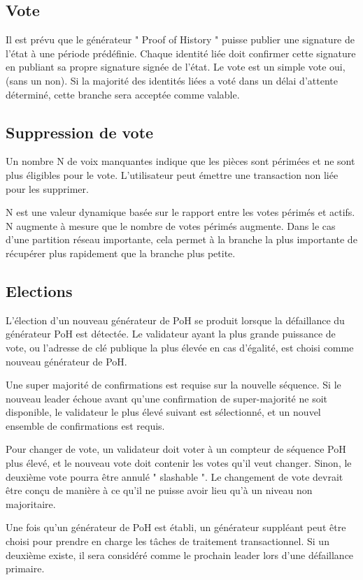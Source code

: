 \documentclass[12pt]{article}
\begin{document}
\subsection{Vote}
Il est prévu que le générateur " Proof of History " puisse publier une signature de l'état à une période prédéfinie. Chaque identité liée doit confirmer cette signature en publiant sa propre signature signée de l'état. Le vote est un simple vote oui, (sans un non).  Si la majorité des identités liées a voté dans un délai d’attente déterminé, cette branche sera acceptée comme valable.

\subsection{Suppression de vote}

Un nombre N de voix manquantes indique que les pièces sont périmées et ne sont plus éligibles pour le vote. L'utilisateur peut émettre une transaction non liée pour les supprimer.

N est une valeur dynamique basée sur le rapport entre les votes périmés et actifs. N augmente à mesure que le nombre de votes périmés augmente. Dans le cas d'une partition réseau importante, cela permet à la branche la plus importante de récupérer plus rapidement que la branche plus petite.

\subsection{Elections}\label{subsec:elections}
L'élection d'un nouveau générateur de PoH se produit lorsque la défaillance du générateur PoH est détectée. Le validateur ayant la plus grande puissance de vote, ou l'adresse de clé publique la plus élevée en cas d'égalité, est choisi comme nouveau générateur de PoH.

Une super majorité de confirmations est requise sur la nouvelle séquence. Si le nouveau leader échoue avant qu'une confirmation de super-majorité ne soit disponible, le validateur le plus élevé suivant est sélectionné, et un nouvel ensemble de confirmations est requis.

Pour changer de vote, un validateur doit voter à un compteur de séquence PoH plus élevé, et le nouveau vote doit contenir les votes qu'il veut changer. Sinon, le deuxième vote pourra être annulé " slashable ". Le changement de vote devrait être conçu de manière à ce qu'il ne puisse avoir lieu qu'à un niveau non majoritaire.

Une fois qu'un générateur de PoH est établi, un générateur suppléant peut être choisi pour prendre en charge les tâches de traitement transactionnel. Si un deuxième existe, il sera considéré comme le prochain leader lors d'une défaillance primaire.
\end{document}
